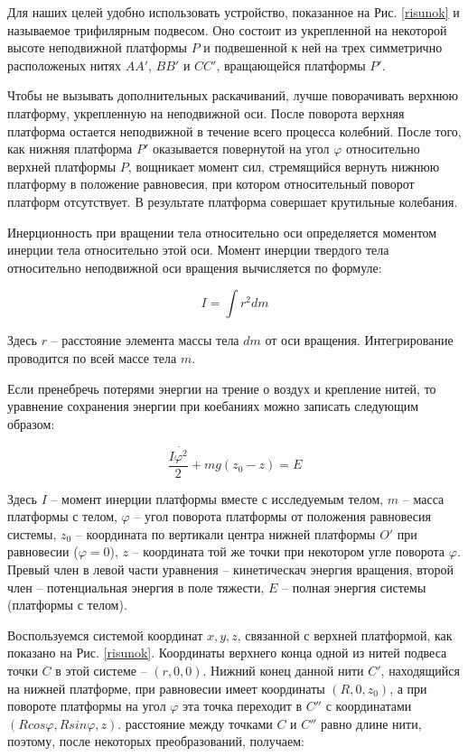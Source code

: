 \documentclass[a4paper]{article}
\begin{document}
Для наших целей удобно использовать устройство, показанное на Рис. \ref{risunok} и называемое трифилярным подвесом. Оно состоит из укрепленной на некоторой высоте неподвижной платформы $P$ и подвешенной к ней на трех симметрично расположеных нитях $AA'$, $BB'$ и $CC'$, вращающейся платформы $P'$. 

Чтобы не вызывать дополнительных раскачиваний, лучше поворачивать верхнюю платформу, укрепленную на неподвижной оси. После поворота верхняя платформа остается неподвижной в течение всего процесса колебний. После того, как нижняя платформа $P'$ оказывается повернутой на угол $\varphi$ относительно верхней платформы $P$, вощникает момент сил, стремящийся вернуть нижнюю платформу в положение равновесия, при котором относительный поворот платформ отсутствует. В результате платформа совершает крутильные колебания.


\par Инерционность при вращении тела относительно оси определяется моментом инерции тела относительно этой оси. Момент инерции твердого тела относительно неподвижной оси вращения вычисляется по формуле:

\begin{equation}
    I = \int r^2 dm
\end{equation}

Здесь $r$ -- расстояние элемента массы тела $dm$ от оси вращения. Интегрирование проводится по всей массе тела $m$.

Если пренебречь потерями энергии на трение о воздух и крепление нитей, то уравнение сохранения энергии при коебаниях можно записать следующим образом:

\begin{equation}\label{moment}
    \frac{I \dot{\varphi^2}}{2} + mg(z_0-z) = E
\end{equation}

Здесь $I$ -- момент инерции платформы вместе с исследуемым телом, $m$ -- масса платформы с телом, $\varphi$ -- угол поворота платформы от положения равновесия системы, $z_0$ -- координата по вертикали центра нижней платформы $O'$  при равновесии ($\varphi = 0$), $z$ -- координата той же точки при некотором угле поворота $\varphi$. Превый член в левой части уравнения -- кинетическач энергия вращения, второй член -- потенциальная энергия в поле тяжести, $E$ -- полная энергия системы (платформы с телом).

Воспользуемся системой координат $x, y, z$, связанной с верхней платформой, как показано на Рис. \ref{risunok}. Координаты верхнего конца одной из нитей подвеса точки $C$ в этой системе -- $(r, 0, 0)$. Нижний конец данной нити $C'$, находящийся на нижней платформе, при равновесии имеет координаты $(R, 0, z_0)$, а при повороте платформы на угол $\varphi$ эта точка переходит в $C''$ с координатами $(Rcos\varphi, Rsin\varphi, z)$. расстояние между точками $C$ и $C''$ равно длине нити, поэтому, после некоторых преобразований, получаем: 
\end{document}
